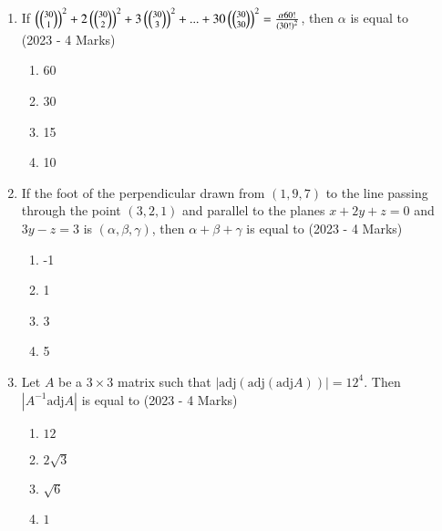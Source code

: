 \documentclass[journal]{IEEEtran}
\begin{document}
\begin{enumerate}
{        }
 	\item{
			If $\left(\binom{30}{1}\right)^2 + 2\left(\binom{30}{2}\right)^2+ 3\left(\binom{30}{3}\right)^2 + ... + 30\left(\binom{30}{30}\right)^2 = \frac{\alpha 60!}{\left(30!\right)^2}$, then $\alpha$ is equal to \\
			\text{ }
			\hfill
			{(2023 - 4 Marks)}
			
			\begin{multicols}{4}
				\begin{enumerate}
					\item 60
					\item 30
					\item 15
					\item 10
				\end{enumerate}
			\end{multicols}
			
		}
 	\item{
			If the foot of the perpendicular drawn from $(1, 9, 7)$
			to the line passing through the point $(3, 2, 1)$ and
			parallel to the planes $x + 2y + z = 0$ and $3y - z = 3$
			is $(\alpha, \beta, \gamma)$, then $\alpha + \beta + \gamma$ is equal to\hfill
			{(2023 - 4 Marks)}
			
			\begin{multicols}{4}
				\begin{enumerate}
					\item -1
					\item 1
					\item 3
					\item 5
				\end{enumerate}
			\end{multicols}
			
		}
    \item{
          	Let $A$ be a $3 \times 3$ matrix such that $|\text{adj} (\text{adj} (\text{adj} A))| = 12^4$. Then $|A^{-1} \text{adj} A|$ is equal to
             \text{ }
             \hfill
                {(2023 - 4 Marks)}
            \begin{multicols}{4}
                \begin{enumerate}
                	\item $12$
                	\item $2\sqrt{3}$
                	\item $\sqrt{6}$
                	\item $1$
                \end{enumerate}
            \end{multicols}

}
\end{enumerate}
\end{document}
